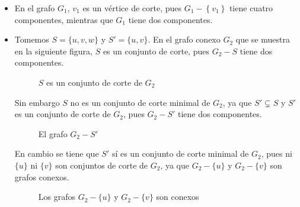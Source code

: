\begin{Ejm}
   \phantom{o}
   \begin{itemize}
      \item En el grafo $G_1$, $v_1$ es un vértice de corte, pues $G_1-\left\lbrace v_1\right\rbrace$ tiene cuatro componentes, mientras que $G_1$ tiene dos componentes.
         \vspace{-0.5cm}
      \item Tomemos $S=\{u,v,w\}$ y $S'=\{u,v\}$. En el grafo conexo $G_2$ que se muestra en la siguiente figura, $S$ es un conjunto de corte, pues $G_2-S$ tiene dos componentes.\vspace{0.1cm}
      \begin{figure}[H]
        \centering
        \resizebox{0.3\textwidth}{!}{}\hspace{2cm}
        \resizebox{0.3\textwidth}{!}{}
        \caption{$S$ es un conjunto de corte de $G_2$}
     \end{figure}\vspace{-0.4cm}
      Sin embargo $S$ no es un conjunto de corte minimal de $G_2$, ya que $S'\subsetneq S$ y $S'$ es un conjunto de corte de $G_2$, pues $G_2-S'$ tiene dos componentes.
      \begin{figure}[H]
        \centering
          \resizebox{0.3\textwidth}{!}{}
        \caption{El grafo $G_2-S'$}
      \end{figure}
      En cambio se tiene que $S'$ sí es un conjunto de corte minimal de $G_2$, pues ni $\{u\}$ ni $\{v\}$ son conjuntos de corte de $G_2$, ya que $G_2-\{u\}$ y $G_2-\{v\}$ son grafos conexos.\vspace{-1.2cm}
      \begin{figure}[H]
        \centering
           \resizebox{0.3\textwidth}{!}{}\hspace{2cm}
          \resizebox{0.3\textwidth}{!}{}
          \vspace{0.5cm}
        \caption{Los grafos $G_2-\{u\}$ y $G_2-\{v\}$ son conexos}
      \end{figure}
   \end{itemize}
\end{Ejm}
